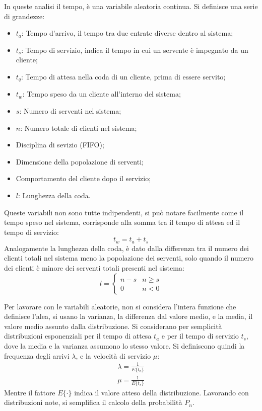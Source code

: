 \documentclass{article}
\numberwithin{equation}{subsection}
\begin{document}
In queste analisi il tempo, è una variabile aleatoria continua. Si definisce una serie di grandezze:
\begin{itemize}
    \item $t_a$: Tempo d'arrivo, il tempo tra due entrate diverse dentro al sistema;
    \item $t_s$: Tempo di servizio, indica il tempo in cui un servente è impegnato da un cliente;
    \item $t_q$: Tempo di attesa nella coda di un cliente, prima di essere servito;
    \item $t_w$: Tempo speso da un cliente all'interno del sistema;
    \item $s$: Numero di serventi nel sistema;
    \item $n$: Numero totale di clienti nel sistema;
    \item Disciplina di sevizio (FIFO);
    \item Dimensione della popolazione di serventi;
    \item Comportamento del cliente dopo il servizio;
    \item $l$: Lunghezza della coda. 
\end{itemize}
Queste variabili non sono tutte indipendenti, si può notare facilmente come il tempo speso nel sistema, corrisponde alla somma tra il tempo di attesa ed il tempo di 
servizio:
\begin{equation}
    t_w=t_a+t_s
\end{equation}
Analogamente la lunghezza della coda, è dato dalla differenza tra il numero dei clienti totali nel sistema meno la popolazione dei serventi, solo quando il numero dei 
clienti è minore dei serventi totali presenti nel sistema:
\begin{equation}
    l=\begin{cases}
        n-s&n\geq s\\
        0&n<0
    \end{cases}
\end{equation}

Per lavorare con le variabili aleatorie, non si considera l'intera funzione che definisce l'alea, si usano la varianza, la differenza dal valore medio, e la media, il valore medio 
assunto dalla distribuzione. Si considerano per semplicità distribuzioni esponenziali per il tempo di attesa $t_a$ e per il tempo di servizio $t_s$, dove la media e la 
varianza assumono lo stesso valore. Si definiscono quindi la frequenza degli arrivi $\lambda$, e la velocità di servizio $\mu$:
\begin{gather}
    \lambda=\displaystyle\frac{1}{E\{t_a\}}\\
    \mu=\displaystyle\frac{1}{E\{t_s\}}
\end{gather}
Mentre il fattore $E\{\cdot\}$ indica il valore atteso della distribuzione. Lavorando con distribuzioni note, si semplifica il calcolo della probabilità $P_n$. 
\end{document}
